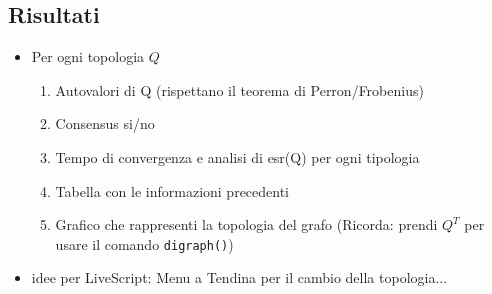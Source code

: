 \subsection*{Risultati}
\begin{itemize}
    \item Per ogni topologia $Q$
    \begin{enumerate}
        \item Autovalori di Q (rispettano il teorema di Perron/Frobenius)
        \item Consensus si/no
        \item Tempo di convergenza e analisi di esr(Q) per ogni tipologia
        \item Tabella con le informazioni precedenti
        \item Grafico che rappresenti la topologia del grafo (Ricorda: prendi $Q^T$ per usare il comando \texttt{digraph()})
    \end{enumerate}
    \item \textsf{idee per LiveScript: Menu a Tendina per il cambio della topologia...}
\end{itemize}
